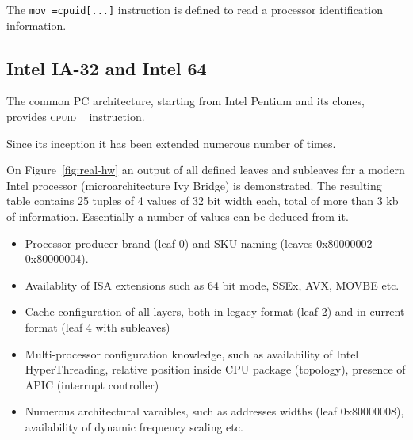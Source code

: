 \documentclass[a4paper,10pt,oneside,unicode]{article}
\newcommand{\cpuid}{\textsc{cpuid} }
\begin{document}
The \texttt{mov =cpuid[...]} instruction is defined to read a processor identification information.

\subsection{Intel IA-32 and Intel 64}

The common PC architecture, starting from Intel Pentium and its clones, provides \cpuid~\cite{intelmanual-7vols, amd-sdm-vol1} instruction. 

Since its inception it has been extended numerous number of times.


On Figure~\ref{fig:real-hw} an output of all defined leaves and subleaves for a modern Intel processor (microarchitecture Ivy Bridge) is demonstrated. The resulting table contains 25 tuples of 4 values of 32 bit width each, total of more than 3 kb of information. Essentially a number of values can be deduced from it.
\begin{itemize}
    \item Processor producer brand (leaf 0) and SKU naming (leaves 0x80000002--0x80000004).
    \item Availablity of ISA extensions such as 64 bit mode, SSEx, AVX, MOVBE etc.
    \item Cache configuration of all layers, both in legacy format (leaf 2) and in current format (leaf 4 with subleaves)
    \item Multi-processor configuration knowledge, such as availability of Intel HyperThreading, relative position inside {CPU} package (topology), presence of {APIC} (interrupt controller)
    \item Numerous architectural varaibles, such as addresses widths (leaf 0x80000008), availability of dynamic frequency scaling etc.
\end{itemize}
\end{document}
